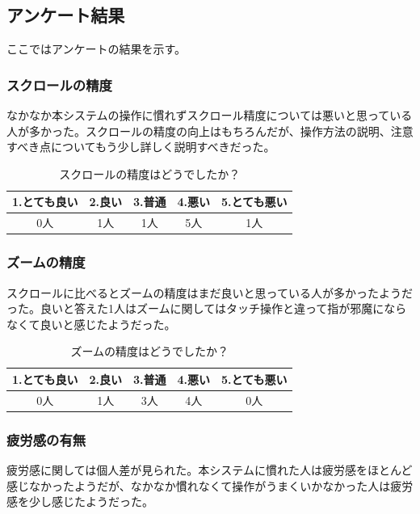 \documentclass[11pt,a4j, titlepage]{jarticle} %
\begin{document}
\subsection{アンケート結果}
ここではアンケートの結果を示す。

\subsubsection{スクロールの精度}
なかなか本システムの操作に慣れずスクロール精度については悪いと思っている人が多かった。スクロールの精度の向上はもちろんだが、操作方法の説明、注意すべき点についてもう少し詳しく説明すべきだった。

\begin{table}[H]
	\begin{center}
	\begin{tabular}{|c|c|c|c|c|} \hline
		1.とても良い & 2.良い & 3.普通 & 4.悪い & 5.とても悪い \\ \hline \hline
		0人 & 1人 & 1人 & 5人 & 1人  \\ \hline
	\end{tabular}
	\caption{スクロールの精度はどうでしたか？}
	\label{table2}
	\end{center}
\end{table}

\subsubsection{ズームの精度}
スクロールに比べるとズームの精度はまだ良いと思っている人が多かったようだった。良いと答えた1人はズームに関してはタッチ操作と違って指が邪魔にならなくて良いと感じたようだった。

\begin{table}[H]
	\begin{center}
	\begin{tabular}{|c|c|c|c|c|} \hline
		1.とても良い & 2.良い & 3.普通 & 4.悪い & 5.とても悪い \\ \hline \hline
		0人 & 1人 & 3人 & 4人 & 0人  \\ \hline
	\end{tabular}
	\caption{ズームの精度はどうでしたか？}
	\label{table3}
	\end{center}
\end{table}

\subsubsection{疲労感の有無}
疲労感に関しては個人差が見られた。本システムに慣れた人は疲労感をほとんど感じなかったようだが、なかなか慣れなくて操作がうまくいかなかった人は疲労感を少し感じたようだった。
\end{document}
